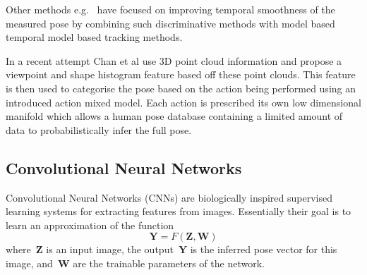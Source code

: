 \documentclass[11pt]{article} %
\begin{document}
Other methods e.g.~\cite{Ye2011,Wei2011,Baak2011,Zhu2008} have focused on improving temporal smoothness of the measured pose by combining such discriminative methods with model based temporal model based tracking methods. 

In a recent attempt Chan et al \cite{Chan2014} use 3D point cloud information and propose a viewpoint and shape histogram feature based off these point clouds. This feature is then used to categorise the pose based on the action being performed using an introduced action mixed model. Each action is prescribed its own low dimensional manifold which allows a human pose database containing a limited amount of data to probabilistically infer the full pose.




\subsection{Convolutional Neural Networks}

Convolutional Neural Networks (CNNs) are biologically inspired supervised learning systems for extracting features from images. Essentially their goal is to learn an approximation of the function
\begin{equation}
\boldsymbol{Y} = F(\boldsymbol{Z},\boldsymbol{W})
\label{eq:networkF}
\end{equation}
where~$\boldsymbol{Z}$ is an input image, the output~$\boldsymbol{Y}$ is the inferred pose vector for this image, and~$\boldsymbol{W}$ are the trainable parameters of the network. 
 
\end{document}
